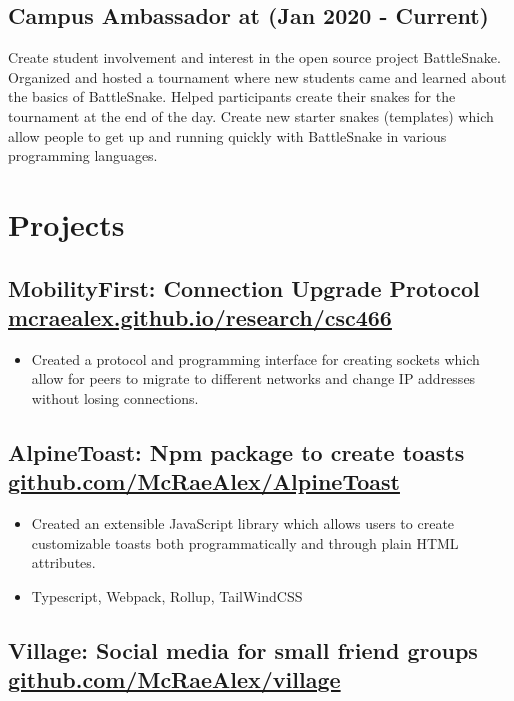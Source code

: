 \documentclass{article}
\newcommand{\hrefColored}[3]{\href{#2}{\color{#1}{#3}}}
\begin{document}
\subsection{Campus Ambassador at \hrefColored{blue}{https://play.battlesnake.com/}{BattleSnake} (Jan 2020 - Current)}

Create student involvement and interest in the open source project BattleSnake.
Organized and hosted a tournament where new students came and learned about the 
basics of BattleSnake. Helped participants create their snakes for the tournament at the end of
the day. Create new starter snakes (templates) which allow people to get up and 
running quickly with BattleSnake in various programming languages.

\section{Projects}

\subsection{MobilityFirst: Connection Upgrade Protocol \href{https://mcraealex.github.io/research/csc466}{mcraealex.github.io/research/csc466}}

\begin{itemize}
    \item Created a protocol and programming interface for creating sockets which allow for peers to migrate to different networks and change IP addresses without losing connections.
\end{itemize}

\subsection{AlpineToast: Npm package to create toasts \href{https://github.com/McRaeAlex/AlpineToast}{github.com/McRaeAlex/AlpineToast}}

\begin{itemize}
    \item Created an extensible JavaScript library which allows users to create customizable toasts both programmatically and through plain HTML attributes. 
    \item Typescript, Webpack, Rollup, TailWindCSS 
\end{itemize}

\subsection{Village: Social media for small friend groups \href{https://github.com/McRaeAlex/village}{github.com/McRaeAlex/village}}
\end{document}
